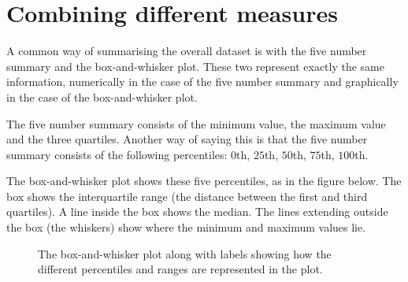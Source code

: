 \section{Combining different measures}
A common way of summarising the overall dataset is with the five
number summary and the box-and-whisker plot. These two represent
exactly the same information, numerically in the case of the five
number summary and graphically in the case of the box-and-whisker
plot.

The five number summary consists of the minimum value, the maximum
value and the three quartiles. Another way of saying this is that the
five number summary consists of the following percentiles: $0$th,
$25$th, $50$th, $75$th, $100$th.

The box-and-whisker plot shows these five percentiles, as in the figure
below. The box shows the interquartile range (the distance between the
first and third quartiles). A line inside the box shows the
median. The lines extending outside the box (the whiskers) show where
the minimum and maximum values lie.

\begin{figure}[h]
  \begin{center}
  \end{center}
  \caption{The box-and-whisker plot along with labels showing how
    the different percentiles and ranges are represented in the plot.}
\end{figure}


